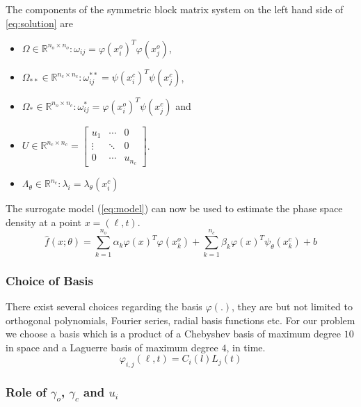%
The components of the symmetric block matrix system on the left hand side of \cref{eq:solution} 
are 
%
\begin{itemize}
\item $\Omega \in \mathbb{R}^{n_{o} \times n_{o}}: \omega_{ij} = \varphi(x^{o}_{i})^{T} \varphi(x^{o}_{j})$,
\item $\Omega_{**} \in \mathbb{R}^{n_{c} \times n_{c}}: \omega^{**}_{ij} = \psi(x^{c}_{i})^{T} \psi(x^{c}_{j})$,
\item $\Omega_{*} \in \mathbb{R}^{n_{o} \times n_{c}}: \omega^{*}_{ij} = \varphi(x^{o}_{i})^{T} \psi(x^{c}_{j})$ and 
\item $U \in \mathbb{R}^{n_{c} \times n_{c}} = \begin{bmatrix}
    u_1 & \cdots & 0 \\ 
    \vdots & \ddots  & 0\\ 
    0 & \cdots  & u_{n_{c}} 
  \end{bmatrix}$.
\item $\Lambda_{\theta} \in \mathbb{R}^{n_{c}}: \lambda_{i} = \lambda_{\theta}(x^{c}_{i})$
\end{itemize}
%
The surrogate model (\cref{eq:model}) can now be used to estimate the phase space density at a 
point $x = (\ell,t)$.
%
\begin{equation}\label{eq:model}
\hat{f}(x;\theta) = 
  \sum_{k = 1}^{n_{o}}{\alpha_{k}\varphi(x)^{T}\varphi(x^{o}_{k}) + 
  \sum_{k = 1}^{n_{c}}}{\beta_{k} \varphi(x)^{T} \psi_{\theta}(x^{c}_{k})} + b
\end{equation}

\subsubsection*{Choice of Basis}

There exist several choices regarding the basis $\varphi(.)$, they are but not limited to 
orthogonal polynomials, Fourier series, radial basis functions etc. For our problem we choose a 
basis which is a product of a Chebyshev basis of maximum degree $10$ in space and a Laguerre basis 
of maximum degree $4$, in time.
%
\begin{equation}\label{eq:basis}
\varphi_{i,j}(\ell,t) = C_{i}(l) L_{j}(t)
\end{equation}
%


\subsubsection*{Role of $\gamma_o$, $\gamma_c$ and $u_i$}

